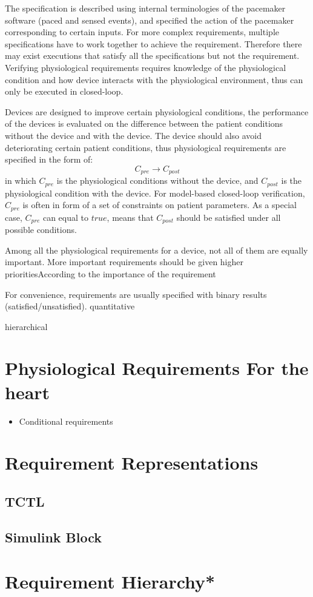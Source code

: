 The specification is described using internal terminologies of the pacemaker software (paced and sensed events), and specified the action of the pacemaker corresponding to certain inputs. For more complex requirements, multiple specifications have to work together to achieve the requirement. Therefore there may exist executions that satisfy all the specifications but not the requirement. Verifying physiological requirements requires knowledge of the physiological condition and how device interacts with the physiological environment, thus can only be executed in closed-loop. 

Devices are designed to improve certain physiological conditions, the performance of the devices is evaluated on the difference between the patient conditions without the device and with the device. The device should also avoid deteriorating certain patient conditions, thus physiological requirements are specified in the form of:
$$C_{pre}\rightarrow C_{post}$$
in which $C_{pre}$ is the physiological conditions without the device,  and $C_{post}$ is the physiological condition with the device. For model-based closed-loop verification, $C_{pre}$ is often in form of a set of constraints on patient parameters. As a special case, $C_{pre}$ can equal to $true$, means that $C_{post}$ should be satisfied under all possible conditions.

Among all the physiological requirements for a device, not all of them are equally important. More important requirements should be given higher prioritiesAccording to the importance of the requirement

For convenience, requirements are usually specified with binary results (satisfied/unsatisfied). quantitative

hierarchical


\section{Physiological Requirements For the heart}
\begin{itemize}
	\item Conditional requirements
\end{itemize}

\section{Requirement Representations}
\subsection{TCTL}
\subsection{Simulink Block}
 
\section{Requirement Hierarchy*}
